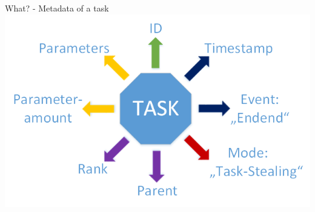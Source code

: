 	\begin{frame}{What? - Metadata of a task}
	\includegraphics[width=1.0\textwidth]{images/Zeichnungedited.png}
	\end{frame}
	
